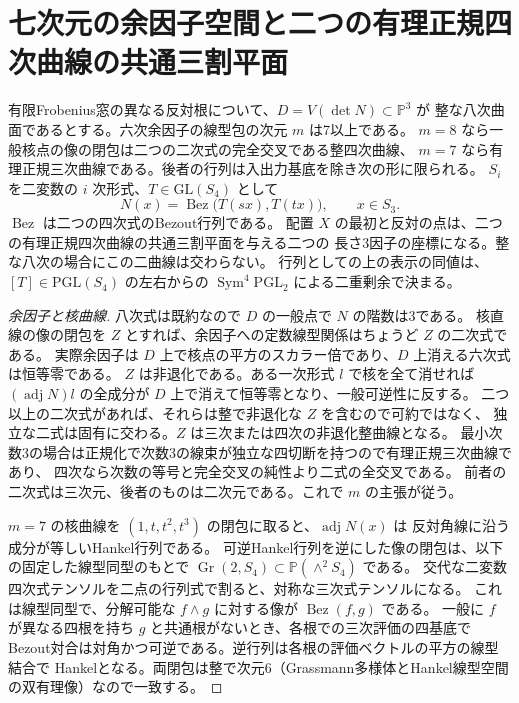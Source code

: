 \section{七次元の余因子空間と二つの有理正規四次曲線の共通三割平面}
\label{sec:seven-cofactor-trisecant-grassmannian}
\begin{theorem}\label{thm:seven-cofactor-trisecant-grassmannian}
有限Frobenius窓の異なる反対根について、$D=V(\det N)\subset\mathbb P^3$ が
整な八次曲面であるとする。六次余因子の線型包の次元 $m$ は7以上である。
$m=8$ なら一般核点の像の閉包は二つの二次式の完全交叉である整四次曲線、
$m=7$ なら有理正規三次曲線である。後者の行列は入出力基底を除き次の形に限られる。
$S_i$ を二変数の $i$ 次形式、$T\in\mathrm{GL}(S_4)$ として
\[
       N(x)=\operatorname{Bez}\big(T(sx),T(tx)\big),\qquad x\in S_3 .
\]
$\operatorname{Bez}$ は二つの四次式のBezout行列である。
配置 $X$ の最初と反対の点は、二つの有理正規四次曲線の共通三割平面を与える二つの
長さ3因子の座標になる。整な八次の場合にこの二曲線は交わらない。
行列としての上の表示の同値は、$[T]\in\mathrm{PGL}(S_4)$ の左右からの
$\operatorname{Sym}^4\mathrm{PGL}_2$ による二重剰余で決まる。
\end{theorem}

\begin{proof}[余因子と核曲線]
八次式は既約なので $D$ の一般点で $N$ の階数は3である。
核直線の像の閉包を $Z$ とすれば、余因子への定数線型関係はちょうど $Z$ の二次式である。
実際余因子は $D$ 上で核点の平方のスカラー倍であり、$D$ 上消える六次式は恒等零である。
$Z$ は非退化である。ある一次形式 $l$ で核を全て消せれば
$(\operatorname{adj}N)l$ の全成分が $D$ 上で消えて恒等零となり、一般可逆性に反する。
二つ以上の二次式があれば、それらは整で非退化な $Z$ を含むので可約ではなく、
独立な二式は固有に交わる。$Z$ は三次または四次の非退化整曲線となる。
最小次数3の場合は正規化で次数3の線束が独立な四切断を持つので有理正規三次曲線であり、
四次なら次数の等号と完全交叉の純性より二式の全交叉である。
前者の二次式は三次元、後者のものは二次元である。これで $m$ の主張が従う。

$m=7$ の核曲線を $(1,t,t^2,t^3)$ の閉包に取ると、$\operatorname{adj}N(x)$ は
反対角線に沿う成分が等しいHankel行列である。
可逆Hankel行列を逆にした像の閉包は、以下の固定した線型同型のもとで
$\operatorname{Gr}(2,S_4)\subset\mathbb P(\wedge^2 S_4)$ である。
交代な二変数四次式テンソルを二点の行列式で割ると、対称な三次式テンソルになる。
これは線型同型で、分解可能な $f\wedge g$ に対する像が $\operatorname{Bez}(f,g)$ である。
一般に $f$ が異なる四根を持ち $g$ と共通根がないとき、各根での三次評価の四基底で
Bezout対合は対角かつ可逆である。逆行列は各根の評価ベクトルの平方の線型結合で
Hankelとなる。両閉包は整で次元6（Grassmann多様体とHankel線型空間の双有理像）なので一致する。
\end{proof}

